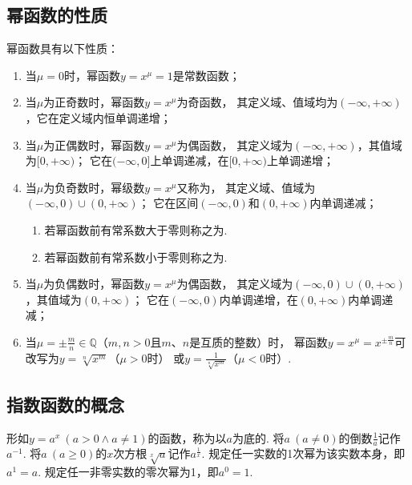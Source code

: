 \subsection{幂函数的性质}
\begin{property}
幂函数具有以下性质：
\begin{enumerate}
	\item 当\(\mu = 0\)时，幂函数\(y=x^{\mu}=1\)是常数函数；

	\item 当\(\mu\)为正奇数时，幂函数\(y=x^{\mu}\)为奇函数，
	其定义域、值域均为\((-\infty,+\infty)\)，它在定义域内恒单调递增；

	\item 当\(\mu\)为正偶数时，幂函数\(y=x^{\mu}\)为偶函数，
	其定义域为\((-\infty,+\infty)\)，其值域为\([0,+\infty)\)；
	它在\((-\infty,0]\)上单调递减，在\([0,+\infty)\)上单调递增；

	\item 当\(\mu\)为负奇数时，幂级数\(y=x^{\mu}\)又称为，
	其定义域、值域为\((-\infty,0)\cup(0,+\infty)\)；
	它在区间\((-\infty,0)\)和\((0,+\infty)\)内单调递减；
	\begin{enumerate}
		\item 若幂函数前有常系数大于零则称之为.
		\item 若幂函数前有常系数小于零则称之为.
	\end{enumerate}

	\item 当\(\mu\)为负偶数时，幂函数\(y=x^{\mu}\)为偶函数，
	其定义域为\((-\infty,0)\cup(0,+\infty)\)，其值域为\((0,+\infty)\)；
	它在\((-\infty,0)\)内单调递增，在\((0,+\infty)\)内单调递减；

	\item 当\(\mu = \pm\frac{m}{n} \in \mathbb{Q}\)（\(m,n>0\)且\(m\)、\(n\)是互质的整数）时，
	幂函数\(y=x^{\mu}=x^{\pm\frac{m}{n}}\)可改写为\(y=\sqrt[n]{x^m}\)（\(\mu>0\)时）
	或\(y=\frac{1}{\sqrt[n]{x^m}}\)（\(\mu<0\)时）.
\end{enumerate}
\end{property}

\subsection{指数函数的概念}
\begin{definition}[指数函数]
形如\(y=a^x\ (a>0 \land a \neq 1)\)的函数，称为以\(a\)为底的.
将\(a\ (a \neq 0)\)的倒数\(\frac{1}{a}\)记作\(a^{-1}\).
将\(a\ (a \geq 0)\)的\(x\)次方根\(\sqrt[x]{a}\)记作\(a^{\frac{1}{x}}\).
规定任一实数的1次幂为该实数本身，即\(a^1=a\).
规定任一非零实数的零次幂为1，即\(a^0=1\).
\end{definition}

